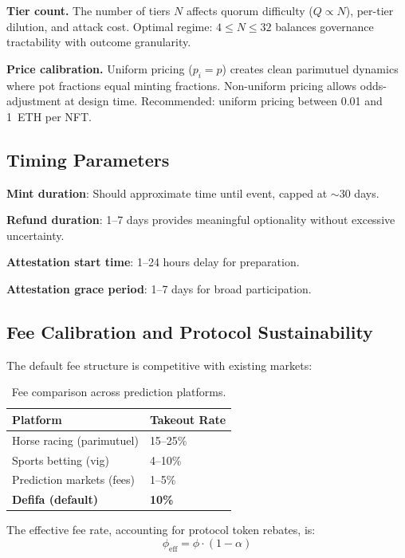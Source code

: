 \documentclass[11pt,a4paper]{article}
\begin{document}
\textbf{Tier count.} The number of tiers $N$ affects quorum difficulty ($Q \propto N$), per-tier dilution, and attack cost. Optimal regime: $4 \leq N \leq 32$ balances governance tractability with outcome granularity.

\textbf{Price calibration.} Uniform pricing ($p_i = p$) creates clean parimutuel dynamics where pot fractions equal minting fractions. Non-uniform pricing allows odds-adjustment at design time. Recommended: uniform pricing between 0.01 and 1~ETH per NFT.

\subsection{Timing Parameters}

\textbf{Mint duration}: Should approximate time until event, capped at $\sim$30 days.

\textbf{Refund duration}: 1--7 days provides meaningful optionality without excessive uncertainty.

\textbf{Attestation start time}: 1--24 hours delay for preparation.

\textbf{Attestation grace period}: 1--7 days for broad participation.

\subsection{Fee Calibration and Protocol Sustainability}

The default fee structure is competitive with existing markets:

\begin{table}[H]
\centering
\begin{tabular}{ll}
\toprule
\textbf{Platform} & \textbf{Takeout Rate} \\
\midrule
Horse racing (parimutuel) & 15--25\% \\
Sports betting (vig) & 4--10\% \\
Prediction markets (fees) & 1--5\% \\
\textbf{Defifa (default)} & \textbf{10\%} \\
\bottomrule
\end{tabular}
\caption{Fee comparison across prediction platforms.}
\end{table}

The effective fee rate, accounting for protocol token rebates, is:
\begin{equation}
\phi_{\text{eff}} = \phi \cdot (1 - \alpha)
\end{equation}
\end{document}
